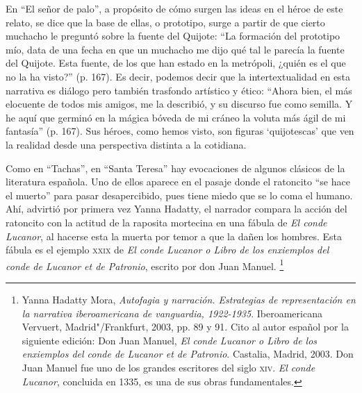 \documentclass[14pt,twoside,final]{extbook} %
\let\oldfootnote\footnote
\renewcommand\footnote[1]{%
\oldfootnote{\hspace{1mm}#1}}
\begin{document}
En ``El señor de palo'', a propósito de cómo surgen las ideas en el héroe de este relato, se dice que la base de ellas, o prototipo, surge a partir de que cierto muchacho le preguntó sobre la fuente del Quijote: ``La formación del prototipo mío, data de una fecha en que un muchacho me dijo qué tal le parecía la fuente del Quijote. Esta fuente, de los que han estado en la metrópoli, ¿quién es el que no la ha visto?'' (p. 167). Es decir, podemos decir que la intertextualidad en esta narrativa es diálogo pero también trasfondo artístico y ético: ``Ahora bien, el más elocuente de todos mis amigos, me la describió, y su discurso fue como semilla. Y he aquí que germinó en la mágica bóveda de mi cráneo la voluta más ágil de mi fantasía'' (p. 167). Sus héroes, como hemos visto, son figuras `quijotescas' que ven la realidad desde una perspectiva distinta a la cotidiana.

Como en ``Tachas'', en ``Santa Teresa'' hay evocaciones de algunos clásicos de la literatura española. Uno de ellos aparece en el pasaje donde el ratoncito ``se hace el muerto'' para pasar
desapercibido, pues tiene miedo que se lo coma el humano. Ahí, advirtió por primera vez Yanna Hadatty, el narrador compara la acción del ratoncito con la actitud de la raposita mortecina en una fábula de \emph{El conde Lucanor}, al hacerse esta la muerta por temor a que la dañen los hombres. Esta fábula es el ejemplo \textsc{xxix} de \emph{El conde Lucanor o Libro de los enxiemplos del conde de Lucanor et de Patronio}, escrito por don Juan Manuel.\footnote{Yanna Hadatty Mora, \emph{Autofagia y narración. Estrategias de representación en la narrativa iberoamericana de vanguardia, 1922-1935}. Iberoamericana Vervuert, Madrid"/Frankfurt, 2003, pp. 89 y 91. Cito al autor español por la siguiente edición: Don Juan Manuel, \emph{El conde Lucanor o Libro de los enxiemplos del conde de Lucanor et de Patronio}. Castalia, Madrid, 2003. Don Juan Manuel fue uno de los grandes escritores del siglo \textsc{xiv}. \emph{El conde Lucanor}, concluida en 1335, es una de sus obras fundamentales.}
\end{document}
